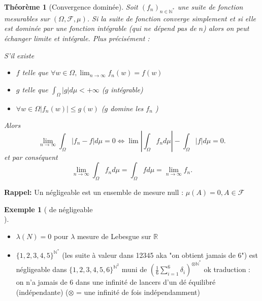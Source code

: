 \documentclass{article}
\theoremstyle{plain}%
\newtheorem{thm}{Théorème}[section]
\theoremstyle{definition}
\newtheorem{exmp}{Exemple}[section]
\theoremstyle{remark}
\begin{document}
    \begin{thm}[Convergence dominée]
        Soit $ (f_n)_{n \in \mathbb{N}^*} $ une suite de fonction mesurables sur $ (\Omega , \mathcal{F}, \mu ) $. Si la suite de fonction converge simplement et si elle est dominée par une fonction intégrable (qui ne dépend pas de $ n $) alors on peut échanger limite et intégrale. Plus précisément : 

        S'il existe \begin{itemize}
            \item $ f $ telle que $ \forall w \in \Omega, \lim_{n \to \infty} f_n(w) = f(w) $
            \item $ g $ telle que $ \int_{\Omega }^{}\left| g \right| d \mu < + \infty  $ ($ g $ intégrable)
            \item $ \forall w \in \Omega \left| f_n(w) \right| \leq g(w) $ ($ g $  domine les $ f_n $ )
        \end{itemize} 
        Alors 
        \[
            \lim_{n \to \infty} \int_{\Omega }^{}\left| f_n -f \right| d \mu = 0 \Leftrightarrow \lim \left| \int_{\Omega }^{}f_n d \mu \right| - \int_{\Omega }^{} \left| f \right| d \mu = 0
        .\]
        et par conséquent 
        \[
            \lim_{n \to \infty} \int_{\Omega }^{}f_n d \mu = \int_{\Omega }^{}f d \mu = \lim_{n \to \infty} f_n
        .\]
    \end{thm}
    \textbf{Rappel:} Un négligeable est un ensemble de mesure null : $ \mu (A) = 0, A \in \mathcal{F} $ \begin{exmp}[ de négligeable\\]
        \begin{itemize}
            \item $ \lambda (N) = 0 $ pour $ \lambda  $ mesure de Lebesgue sur $ \mathbb{R} $ 
            \item $ \{1,2,3,4,5\}^{\mathbb{N}^*} $ (les suite à valeur dans 12345 aka "on obtient jamais de 6") est négligeable dans $ \{1,2,3,4,5,6\}^{\mathbb{N}^2} $ muni de $ (\frac{1}{6} \sum_{i=1}^{6} \delta _i)^{\otimes \mathbb{N}^*} $ ok traduction : on n'a jamais de 6 dans une infinité de lancers d'un dé équilibré (indépendante) ($ \otimes  $ = une infinité de fois indépendamment)
        \end{itemize}
    \end{exmp}
    
\end{document}

